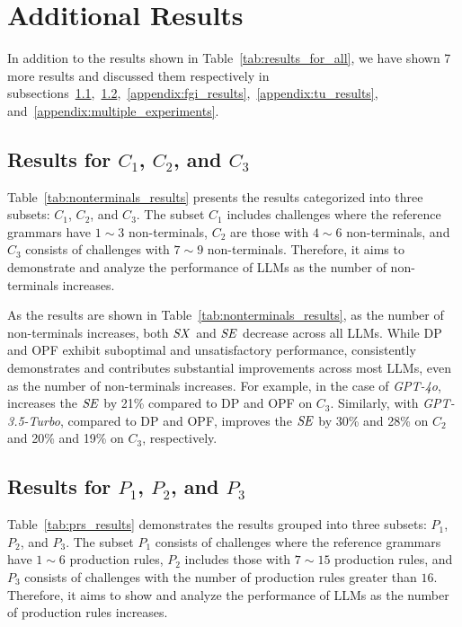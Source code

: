 \section{Additional Results}
\label{appendix:additional_results}
In addition to the results shown in Table~\ref{tab:results_for_all}, we have shown 7 more results and discussed them respectively in subsections~\ref{appendix:nonterminals_results},~\ref{appendix:prs_results},~\ref{appendix:fgi_results},~\ref{appendix:tu_results}, and~\ref{appendix:multiple_experiments}.

\subsection{Results for $C_1$, $C_2$, and $C_3$}
\label{appendix:nonterminals_results}
Table~\ref{tab:nonterminals_results} presents the results categorized into three subsets: $C_1$, $C_2$, and $C_3$. The subset $C_1$ includes challenges where the reference grammars have $1\sim3$ non-terminals, $C_2$ are those with $4\sim6$ non-terminals, and $C_3$ consists of challenges with $7\sim9$ non-terminals. Therefore, it aims to demonstrate and analyze the performance of LLMs as the number of non-terminals increases.

As the results are shown in Table~\ref{tab:nonterminals_results}, as the number of non-terminals increases, both $\mathit{SX}$ and $\mathit{SE}$ decrease across all LLMs. While DP and OPF exhibit suboptimal and unsatisfactory performance, \NAME consistently demonstrates and contributes substantial improvements across most LLMs, even as the number of non-terminals increases. For example, in the case of \textit{GPT-4o}, \NAME increases the $\mathit{SE}$ by 21\% compared to DP and OPF on $C_3$. Similarly, with \textit{GPT-3.5-Turbo}, compared to DP and OPF, \NAME improves the $\mathit{SE}$ by 30\% and 28\% on $C_2$ and 20\% and 19\% on $C_3$, respectively.

\subsection{Results for $P_1$, $P_2$, and $P_3$}
\label{appendix:prs_results}
Table~\ref{tab:prs_results} demonstrates the results grouped into three subsets: $P_1$, $P_2$, and $P_3$. The subset $P_1$ consists of challenges where the reference grammars have $1\sim6$ production rules, $P_2$ includes those with $7\sim15$ production rules, and $P_3$ consists of challenges with the number of production rules greater than $16$. Therefore, it aims to show and analyze the performance of LLMs as the number of production rules increases. 

